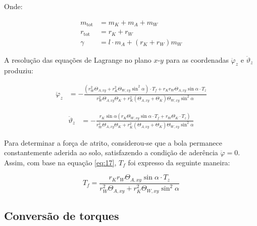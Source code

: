 Onde:

\begin{equation*}
    \begin{aligned}
        m_{\text{tot}} &= m_K + m_A + m_W \\
        r_{\text{tot}} &= r_K + r_W \\
        \gamma &= l \cdot m_A + (r_K + r_W) m_W
    \end{aligned}
\end{equation*}

A resolução das equações de Lagrange no plano $x$-$y$ para as coordenadas $\ddot{\varphi}_z$ e $\ddot{\vartheta}_z$ produziu:

\begin{equation}
    \label{eq:17}
    \begin{aligned}
    \ddot{\varphi}_z &= 
    -\frac{
    \left( r_W^2 \Theta_{A,xy} + r_K^2 \Theta_{W,xy} \sin^2 \alpha \right) \cdot T_f + r_K r_W \Theta_{A,xy} \sin \alpha \cdot T_z
    }{
    r_W^2 \Theta_{A,xy} \Theta_K + r_K^2 \left( \Theta_{A,xy} + \Theta_K \right) \Theta_{W,xy} \sin^2 \alpha
    }
    \end{aligned}
\end{equation}

\begin{equation}
    \label{eq:18}
    \begin{aligned}
    \ddot{\vartheta}_z &= 
    -\frac{
    r_K \sin \alpha \left( r_K \Theta_{W,xy} \sin \alpha \cdot T_f + r_W \Theta_K \cdot T_z \right)
    }{
    r_W^2 \Theta_{A,xy} \Theta_K + r_K^2 \left( \Theta_{A,xy} + \Theta_K \right) \Theta_{W,xy} \sin^2 \alpha
    }
    \end{aligned}
\end{equation}

Para determinar a força de atrito, considerou-se que a bola permanece constantemente aderida ao solo, satisfazendo a condição de aderência $\ddot\varphi=0$. Assim, com base na equação \ref{eq:17}, $T_f$ foi expresso da seguinte maneira:

\begin{equation*}
    T_f = \frac{r_K r_W \Theta_{A,xy} \sin \alpha \cdot T_z}{r_W^2 \Theta_{A,xy} + r_K^2 \Theta_{W,xy} \sin^2 \alpha}
\end{equation*}

\subsection{Conversão de torques}

